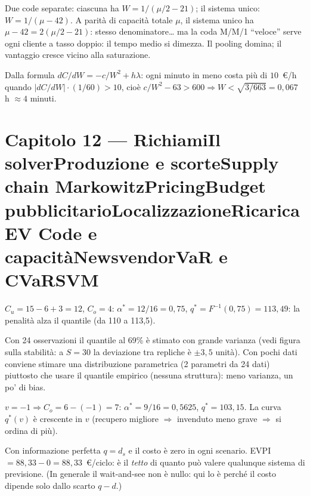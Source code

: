 \documentclass[11pt,a4paper]{article}
\newcounter{cap}
\newcounter{sol}[cap]
\newcommand{\capitolo}[1]{\setcounter{cap}{#1}\section*{Capitolo #1 --- \capnome{#1}}}
\newcommand{\capnome}[1]{%
  \ifcase#1\or\or Richiami\or Il solver\or Produzione e scorte\or Supply chain\or
  Markowitz\or Pricing\or Budget pubblicitario\or Localizzazione\or Ricarica EV\or
  Code e capacità\or Newsvendor\or VaR e CVaR\or SVM\fi}
\begin{document}
\begin{soluzione}[pooling]
Due code separate: ciascuna ha $W = 1/(\mu/2 - 21)$; il sistema unico:
$W = 1/(\mu - 42)$. A parità di capacità totale $\mu$, il sistema unico ha
$\mu - 42 = 2(\mu/2 - 21)$: stesso denominatore\dots{} ma la coda M/M/1 ``veloce''
serve ogni cliente a tasso doppio: il tempo medio si dimezza. Il pooling domina;
il vantaggio cresce vicino alla saturazione.
\end{soluzione}

\begin{soluzione}[frontiera]
Dalla formula $dC/dW = -c/W^2 + h\lambda$: ogni minuto in meno costa più di
$10$~\euro/h quando $|dC/dW| \cdot (1/60) > 10$, cioè
$c/W^2 - 63 > 600 \Rightarrow W < \sqrt{3/663} = 0{,}067$ h $\approx 4$ minuti.
\end{soluzione}

\capitolo{12}

\begin{soluzione}[verifica]
$C_u = 15 - 6 + 3 = 12$, $C_o = 4$: $\alpha^* = 12/16 = 0{,}75$,
$q^* = F^{-1}(0{,}75) = 113{,}49$: la penalità alza il quantile (da 110 a 113,5).
\end{soluzione}

\begin{soluzione}
Con 24 osservazioni il quantile al 69\% è stimato con grande varianza (vedi figura
sulla stabilità: a $S = 30$ la deviazione tra repliche è $\pm 3{,}5$ unità). Con
pochi dati conviene stimare una distribuzione parametrica (2 parametri da 24 dati)
piuttosto che usare il quantile empirico (nessuna struttura): meno varianza, un po'
di bias.
\end{soluzione}

\begin{soluzione}[deperibili]
$v = -1 \Rightarrow C_o = 6 - (-1) = 7$: $\alpha^* = 9/16 = 0{,}5625$,
$q^* = 103{,}15$. La curva $q^*(v)$ è crescente in $v$ (recupero migliore
$\Rightarrow$ invenduto meno grave $\Rightarrow$ si ordina di più).
\end{soluzione}

\begin{soluzione}[EVPI]
Con informazione perfetta $q = d_s$ e il costo è zero in ogni scenario. EVPI
$= 88{,}33 - 0 = 88{,}33$~\euro/ciclo: è il \emph{tetto} di quanto può valere
qualunque sistema di previsione. (In generale il wait-and-see non è nullo: qui lo è
perché il costo dipende solo dallo scarto $q - d$.)
\end{soluzione}
\end{document}
